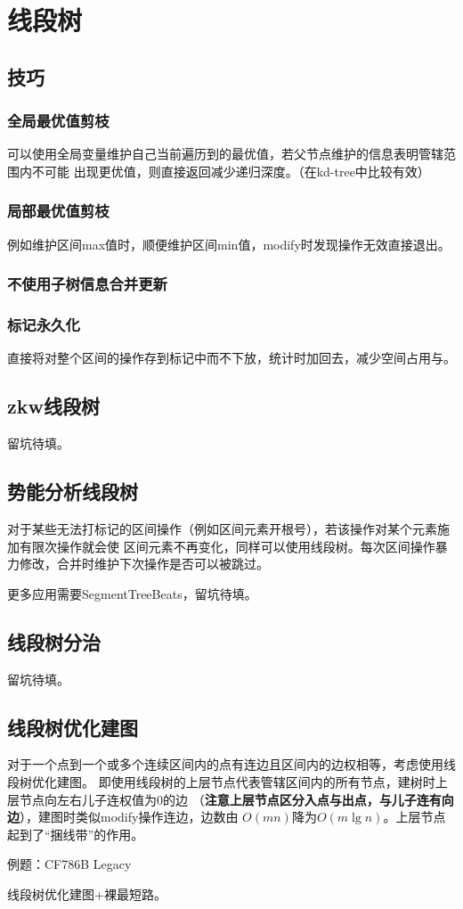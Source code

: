 \section{线段树}
\subsection{技巧}
\subsubsection{全局最优值剪枝}
可以使用全局变量维护自己当前遍历到的最优值，若父节点维护的信息表明管辖范围内不可能
出现更优值，则直接返回减少递归深度。（在kd-tree中比较有效）
\subsubsection{局部最优值剪枝}
例如维护区间max值时，顺便维护区间min值，modify时发现操作无效直接退出。
\subsubsection{不使用子树信息合并更新}

\subsubsection{标记永久化}
直接将对整个区间的操作存到标记中而不下放，统计时加回去，减少空间占用与。
\subsection{zkw线段树}
留坑待填。
\subsection{势能分析线段树}
对于某些无法打标记的区间操作（例如区间元素开根号），若该操作对某个元素施加有限次操作就会使
区间元素不再变化，同样可以使用线段树。每次区间操作暴力修改，合并时维护下次操作是否可以被跳过。

更多应用需要SegmentTreeBeats，留坑待填。
\subsection{线段树分治}
留坑待填。
\subsection{线段树优化建图}
对于一个点到一个或多个连续区间内的点有连边且区间内的边权相等，考虑使用线段树优化建图。
即使用线段树的上层节点代表管辖区间内的所有节点，建树时上层节点向左右儿子连权值为0的边
（{\bfseries 注意上层节点区分入点与出点，与儿子连有向边}），建图时类似modify操作连边，边数由
$O(mn)$降为$O(m\lg n)$。上层节点起到了``捆线带''的作用。

例题：CF786B Legacy

线段树优化建图+裸最短路。


